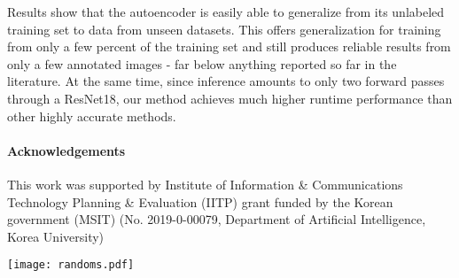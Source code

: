 \documentclass[10pt,twocolumn,letterpaper]{article}
\begin{document}
Results show that the autoencoder is easily able to generalize from its unlabeled training set to data from unseen datasets. This offers generalization for training from only a few percent of the training set and still produces reliable results from only a few annotated images - far below anything reported so far in the literature.
At the same time, since inference amounts to only two forward passes through a ResNet18, our method achieves much higher runtime performance than other highly accurate methods.




\paragraph{Acknowledgements}\vspace{-0.0cm}
This work was supported by Institute of Information \& Communications Technology Planning \& Evaluation (IITP) grant funded by the Korean government (MSIT) (No. 2019-0-00079, Department of Artificial Intelligence, Korea University)

\clearpage
{\small
    
    
}

\clearpage
\appendix

\begin{figure*}
	\begin{center}
         \texttt{[image: randoms.pdf]}
	\end{center}
    \vspace{-0.4cm}
    \label{fig:random_faces}
\end{figure*}
\end{document}
